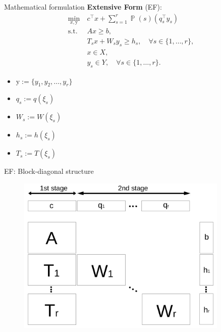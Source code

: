 \documentclass[usenames,dvipsnames]{beamer}
\DeclareMathOperator*{\PP}{\mathbb{P}}
\begin{document}
\begin{frame}{Mathematical formulation}
\textbf{Extensive Form} (EF):
\begin{subequations}\label{sip:ef}
\begin{align}
\min_{x,\mathrm{y}}\ &c^{\top}x + \sum_{s=1}^{r}\PP(s) (q_s^{\top}y_s) \label{ef:obj}\\ 
\mathrm{s.t.}\ &Ax\ge b,  \label{ef:b}\\
&T_s x+W_s y_s\ge h_s,\quad\forall s\in\{1,\ldots,r\}, \label{ef:c} \\
&x\in X, \label{ef:d} \\
&y_s \in Y,\quad\forall s\in\{1,\ldots,r\}. \label{ef:e}
\end{align}
\end{subequations}
\vspace{-0.4cm}
\begin{itemize}
\item $\mathrm{y}:=\{y_1,y_2,\ldots,y_r\}$
\item $q_s:=q(\xi_s)$
\item $W_s:=W(\xi_s)$
\item $h_s:=h(\xi_s)$
\item $T_s:=T(\xi_s)$
\end{itemize}
\end{frame}

\begin{frame}{EF: Block-diagonal structure}
\begin{figure}
\begin{center}
\includegraphics[width=0.9\textwidth]{stagewise_sparsity_slide}
\end{center}
\end{figure}
\end{frame}
\end{document}
